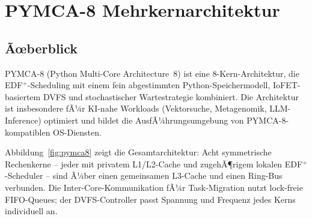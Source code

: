 ﻿\documentclass[a4paper,12pt]{scrreprt}
\theoremstyle{definition}
\begin{document}
	\chapter{PYMCA-8 Mehrkernarchitektur}
	
	\section{Ãœberblick}

	PYMCA-8 (Python Multi-Core Architecture~8) \cite{Epp2026pymca8} ist eine
	8-Kern-Architektur, die EDF$^+$-Scheduling mit einem fein abgestimmten
	Python-Speichermodell, IoFET-basiertem DVFS und stochastischer
	Wartestrategie kombiniert. Die Architektur ist insbesondere fÃ¼r
	KI-nahe Workloads (Vektorsuche, Metagenomik, LLM-Inference) optimiert
	und bildet die AusfÃ¼hrungsumgebung von PYMCA-8-kompatiblen OS-Diensten.

	Abbildung~\ref{fig:pymca8} zeigt die Gesamtarchitektur: Acht symmetrische
	Rechenkerne -- jeder mit privatem L1/L2-Cache und zugehÃ¶rigem lokalen
	EDF$^+$-Scheduler -- sind Ã¼ber einen gemeinsamen L3-Cache und einen
	Ring-Bus verbunden. Die Inter-Core-Kommunikation fÃ¼r Task-Migration nutzt
	lock-freie FIFO-Queues; der DVFS-Controller passt Spannung und Frequenz
	jedes Kerns individuell an.
\end{document}
